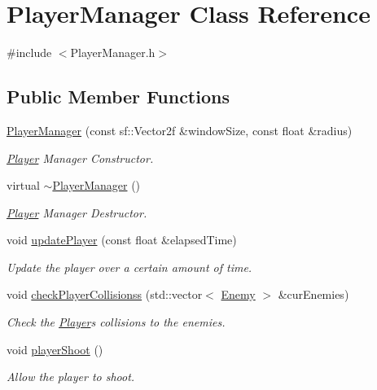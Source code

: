 \hypertarget{class_player_manager}{}\section{Player\+Manager Class Reference}
\label{class_player_manager}


{\ttfamily \#include $<$Player\+Manager.\+h$>$}

\subsection*{Public Member Functions}
\begin{DoxyCompactItemize}
\item 
\hyperlink{class_player_manager_aa2ce60af19b9d80bd884e2edaea726d6}{Player\+Manager} (const sf\+::\+Vector2f \&window\+Size, const float \&radius)
\begin{DoxyCompactList}\small\item\em \hyperlink{class_player}{Player} Manager Constructor. \end{DoxyCompactList}\item 
virtual \hyperlink{class_player_manager_ab53de6b16914b7591fc2bd3038069ac7}{$\sim$\+Player\+Manager} ()
\begin{DoxyCompactList}\small\item\em \hyperlink{class_player}{Player} Manager Destructor. \end{DoxyCompactList}\item 
void \hyperlink{class_player_manager_a171946405d72c219802315721e09467d}{update\+Player} (const float \&elapsed\+Time)
\begin{DoxyCompactList}\small\item\em Update the player over a certain amount of time. \end{DoxyCompactList}\item 
void \hyperlink{class_player_manager_ac4bad97c7d281a47a876d7cee5f864bd}{check\+Player\+Collisionss} (std\+::vector$<$ \hyperlink{class_enemy}{Enemy} $>$ \&cur\+Enemies)
\begin{DoxyCompactList}\small\item\em Check the \hyperlink{class_player}{Player}\textquotesingle{}s collisions to the enemies. \end{DoxyCompactList}\item 
void \hyperlink{class_player_manager_a7a61c6484a3dd12293d2481c5f61fb71}{player\+Shoot} ()
\begin{DoxyCompactList}\small\item\em Allow the player to shoot. \end{DoxyCompactList}\item 

\end{DoxyCompactItemize}
